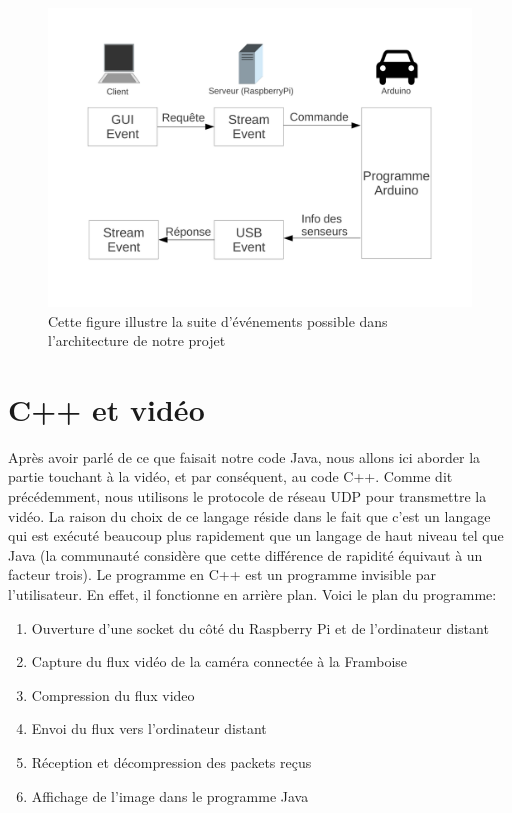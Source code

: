 \documentclass[a4paper,11pt]{report}
\begin{document}
{\begin{figure}[h]
\includegraphics[width=1.0\textwidth]{figures/EventProgramming2.pdf}
\caption[Evénements dans notr architecture]{\label{SuiteEvent}Cette figure illustre la suite d'événements possible dans l'architecture de notre projet}
\end{figure}
\section{C++ et vidéo}

Après avoir parlé de ce que faisait notre code Java, nous allons ici aborder la partie touchant à la vidéo, et par conséquent, au code C++.  Comme dit précédemment, nous utilisons le protocole de réseau UDP  pour transmettre la vidéo. La raison du choix de ce langage réside dans le fait que c'est un langage qui est exécuté beaucoup plus rapidement que un langage de haut niveau tel que Java (la communauté considère que cette différence de rapidité équivaut à un facteur trois). Le programme en C++ est un programme invisible par l'utilisateur. En effet, il fonctionne en arrière plan. Voici le plan du programme:
\begin{enumerate}
\item Ouverture d'une socket du côté du Raspberry Pi et de l'ordinateur distant
\item Capture du flux vidéo de la caméra connectée à la Framboise
\item Compression du flux video
\item Envoi du flux vers l'ordinateur distant
\item Réception et décompression des packets reçus
\item Affichage de l'image dans le programme Java
\end{enumerate}



}
\end{document}
